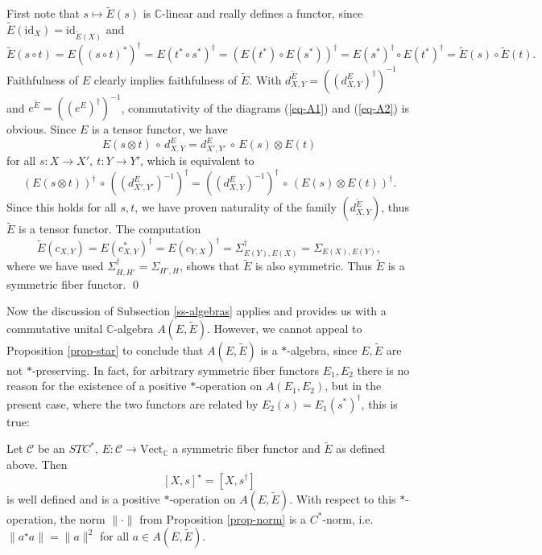 \documentclass[11pt]{article}
\theoremstyle{definition}
\theoremstyle{definition}
\theoremstyle{remark}
\newcommand{\Vect}{\mathrm{Vect}}
\def\2#1{{\mathcal #1}}
\def\7#1{{\mathbb #1}}
\newcommand{\mcirc}{\,\circ\,}
\newcommand{\rarr}{\rightarrow}
\def\id{\mathrm{id}}
\begin{document}
\prf First note that $s\mapsto\widetilde{E}(s)$ is $\7C$-linear and really defines a functor, since 
$\widetilde{E}(\id_X)=\id_{\widetilde{E}(X)}$ and 
\[ \widetilde{E}(s\circ t)=E((s\circ t)^*)^\dagger=E(t^*\circ
s^*)^\dagger=(E(t^*)\circ E(s^*))^\dagger =E(s^*)^\dagger\circ
E(t^*)^\dagger=\widetilde{E}(s)\circ\widetilde{E}(t). \] Faithfulness
of $E$ clearly implies faithfulness of $\widetilde{E}$.  With
$d^{\widetilde{E}}_{X,Y}=((d^E_{X,Y})^\dagger)^{-1}$ and
$e^{\widetilde{E}}=((e^E)^\dagger)^{-1}$, commutativity of the
diagrams (\ref{eq-A1}) and (\ref{eq-A2}) is obvious. Since $E$ is a
tensor functor, we have
\[ E(s\otimes t)\mcirc d^E_{X,Y}=d^E_{X',Y'}\mcirc E(s)\otimes E(t) \]
for all $s:X\rarr X',\ t:Y\rarr Y'$, which is equivalent to
\[ (E(s\otimes t))^\dagger\mcirc((d^E_{X',Y'})^{-1})^\dagger 
   =((d^E_{X,Y})^{-1})^\dagger\mcirc(E(s)\otimes E(t))^\dagger. \]
Since this holds for all $s,t$, we have proven naturality of the family
$(d^{\widetilde{E}}_{X,Y})$, thus $\widetilde{E}$ is a tensor functor. The computation
\[
\widetilde{E}(c_{X,Y})=E(c_{X,Y}^*)^\dagger=E(c_{Y,X})^\dagger=\Sigma_{E(Y),E(X)}^\dagger
=\Sigma_{E(X),E(Y)}, \] where we have used
$\Sigma_{H,H'}^\dagger=\Sigma_{H',H}$, shows that $\widetilde{E}$ is
also symmetric. Thus $\widetilde{E}$ is a symmetric fiber functor.
\qed

Now the discussion of Subsection \ref{ss-algebras} applies and
provides us with a commutative unital $\7C$-algebra
$A(E,\widetilde{E})$. However, we cannot appeal to Proposition
\ref{prop-star} to conclude that $A(E,\widetilde{E})$ is a
$*$-algebra, since $E,\widetilde{E}$ are not $*$-preserving.  In fact,
for arbitrary symmetric fiber functors $E_1,E_2$ there is no reason
for the existence of a positive $*$-operation on $A(E_1,E_2)$, but in
the present case, where the two functors are related by
$E_2(s)=E_1(s^*)^\dagger$, this is true:

\bprop Let $\2C$ be an $STC^*$, $E:\2C\rarr\Vect_\7C$ a symmetric fiber functor and $\widetilde{E}$
as defined above. Then 
\[ [X,s]^\star=[X,s^\dagger] \] is well defined and is a positive
$*$-operation on $A(E,\widetilde{E})$. With respect to this
$*$-operation, the norm $\|\cdot\|$ from Proposition \ref{prop-norm}
is a $C^*$-norm, i.e.\ $\|a^\star a\|=\|a\|^2$ for all $a\in
A(E,\widetilde{E})$.  \eprop
\end{document}
